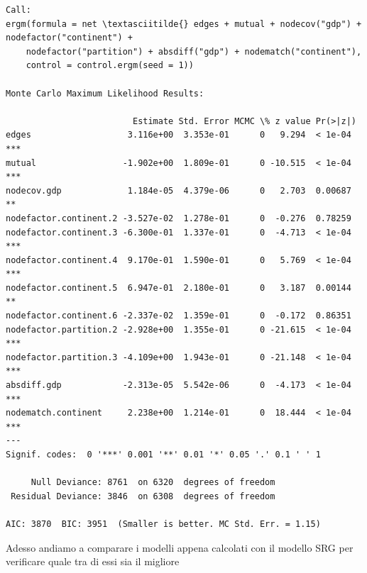 \documentclass[11pt]{article}
\begin{document}
    
    \begin{Verbatim}[commandchars=\\\{\}]
Call:
ergm(formula = net \textasciitilde{} edges + mutual + nodecov("gdp") + nodefactor("continent") + 
    nodefactor("partition") + absdiff("gdp") + nodematch("continent"), 
    control = control.ergm(seed = 1))

Monte Carlo Maximum Likelihood Results:

                         Estimate Std. Error MCMC \% z value Pr(>|z|)    
edges                   3.116e+00  3.353e-01      0   9.294  < 1e-04 ***
mutual                 -1.902e+00  1.809e-01      0 -10.515  < 1e-04 ***
nodecov.gdp             1.184e-05  4.379e-06      0   2.703  0.00687 ** 
nodefactor.continent.2 -3.527e-02  1.278e-01      0  -0.276  0.78259    
nodefactor.continent.3 -6.300e-01  1.337e-01      0  -4.713  < 1e-04 ***
nodefactor.continent.4  9.170e-01  1.590e-01      0   5.769  < 1e-04 ***
nodefactor.continent.5  6.947e-01  2.180e-01      0   3.187  0.00144 ** 
nodefactor.continent.6 -2.337e-02  1.359e-01      0  -0.172  0.86351    
nodefactor.partition.2 -2.928e+00  1.355e-01      0 -21.615  < 1e-04 ***
nodefactor.partition.3 -4.109e+00  1.943e-01      0 -21.148  < 1e-04 ***
absdiff.gdp            -2.313e-05  5.542e-06      0  -4.173  < 1e-04 ***
nodematch.continent     2.238e+00  1.214e-01      0  18.444  < 1e-04 ***
---
Signif. codes:  0 '***' 0.001 '**' 0.01 '*' 0.05 '.' 0.1 ' ' 1

     Null Deviance: 8761  on 6320  degrees of freedom
 Residual Deviance: 3846  on 6308  degrees of freedom
 
AIC: 3870  BIC: 3951  (Smaller is better. MC Std. Err. = 1.15)
    \end{Verbatim}

    
    Adesso andiamo a comparare i modelli appena calcolati con il modello SRG
per verificare quale tra di essi sia il migliore
\end{document}

